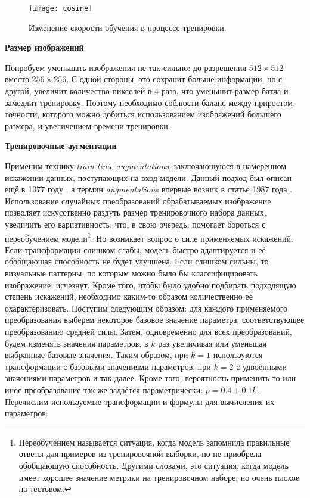 \begin{figure}[h]
    \begin{center}
   	    \texttt{[image: cosine]}
   	\end{center}
   	\caption{Изменение скорости обучения в процессе тренировки.}
   	\label{tikzpicture: cosine}
\end{figure}


\vspace{0.5cm}
\indent
\indent
\textbf{Размер изображений}

\indent
Попробуем уменьшать изображения не так сильно: 
до разрешения $512 \times 512$ вместо $256 \times 256 $.
С одной стороны, это сохранит больше информации, но с другой, увеличит 
количество пикселей в 4 раза, что уменьшит размер
батча и замедлит тренировку.
Поэтому необходимо соблюсти баланс между приростом точности,
которого можно добиться использованием изображений большего размера,
и увеличением времени тренировки.


\vspace{0.5cm}
\indent    
\indent
\textbf{Тренировочные аугментации}

\indent
Применим технику \textit{train time augmentations}, заключающуюся
в намеренном искажении данных, поступающих на вход модели.
Данный подход был описан ещё в 1977 году \cite{em_augs}, а термин 
\textit{augmentations} впервые возник в статье 1987 года \cite{augs}.
Использование случайных преобразований обрабатываемых
изображение позволяет искусственно
раздуть размер тренировочного набора данных, увеличить его 
вариативность, что, в свою очередь, помогает бороться с переобучением
модели\footnote{Переобучением называется ситуация, когда модель
запомнила правильные ответы для примеров из тренировочной выборки,
но не приобрела обобщающую способность. Другими словами, это ситуация,
когда модель имеет хорошее значение метрики на тренировочном наборе,
но очень плохое на тестовом.}.
Но возникает вопрос о силе применяемых искажений.
Если трансформации слишком слабы, модель быстро адаптируется
 и её обобщающая 
способность не будет улучшена. Если слишком сильны, то визуальные паттерны, по
которым можно было бы классифицировать изображение, исчезнут. 
Кроме того, чтобы было удобно подбирать подходящую степень искажений,
необходимо каким-то образом количественно её охарактеризовать.
Поступим следующим образом:
для каждого применяемого преобразования выберем некоторое базовое значение 
параметра, соответствующее преобразованию средней силы. 
Затем, одновременно для всех преобразований, будем изменять значения параметров,
в $k$ раз увеличивая или уменьшая выбранные базовые значения.
Таким образом, при $k = 1$ используются трансформации 
с базовыми значениями параметров, при $k = 2$ с удвоенными 
значениями параметров и так далее. Кроме того, вероятность применить то или
иное преобразование так же задаётся параметрически:
$p = 0.4 + 0.1k$.
Перечислим используемые трансформации
и формулы для вычисления их параметров:

